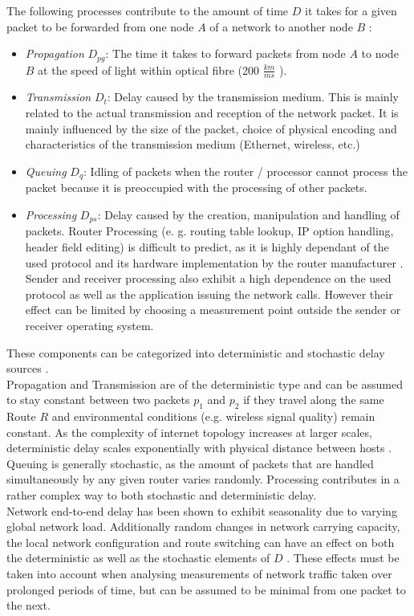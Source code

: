 \documentclass[12pt,a4paper,automark, toc=bib]{scrreprt}
\theoremstyle{definition}
\begin{document}
			The following processes contribute to the amount of time $D$ it takes for a given packet to be forwarded from one node $A$ of a network to another node $B$  \cite{Goonatilake2012, Bovy}:
			\begin{itemize}
				\item \textit{Propagation} $D_{pg}$: The time it takes to forward packets from node $A$ to node $B$ at the speed of light within optical fibre (200 $\frac{km}{ms}$  \cite{Cottrel2015}).  
				\item \textit{Transmission} $D_{t}$: Delay caused by the transmission medium. This is mainly related to the actual transmission and reception of the network packet. It is mainly influenced by the size of the packet, choice of physical encoding and characteristics of the transmission medium (Ethernet, wireless, etc.) 
				\item \textit{Queuing} $D_{q}$: Idling of packets when the router / processor cannot process the packet because it is preoccupied with the processing of other packets. 
				\item \textit{Processing} $D_{ps}$: Delay caused by the creation, manipulation and handling of packets. Router Processing (e. g. routing table lookup, IP option handling, header field editing) is difficult to predict, as it is highly dependant of the used protocol and its hardware implementation by the router manufacturer  \cite{Popescu2008}. Sender and receiver processing also exhibit a high dependence on the used protocol as well as the application issuing the network calls. However their effect can be limited by choosing a measurement point outside the sender or receiver operating system.
			\end{itemize}

			These components can be categorized into deterministic and stochastic delay sources  \cite{Bovy}. \\
			Propagation and Transmission are of the deterministic type and can be assumed to stay constant between two packets $p_1$ and $p_2$ if they travel along the same Route $R$ and environmental conditions (e.g. wireless signal quality) remain constant. As the complexity of internet topology increases at larger scales, deterministic delay scales exponentially with physical distance between hosts  \cite{Hillmann2015}. Queuing is generally stochastic, as the amount of packets that are handled simultaneously by any given router varies randomly. Processing contributes in a rather complex way to both stochastic and deterministic delay. \\ 
			Network end-to-end delay has been shown to exhibit seasonality  \cite{Hooghiemstra} due to varying global network load. Additionally random changes in network carrying capacity, the local network configuration and route switching can have an effect on both the deterministic as well as the stochastic elements of $D$  \cite{Bovy}. These effects must be taken into account when analysing measurements of network traffic taken over prolonged periods of time, but can be assumed to be minimal from one packet to the next. \\
			
\end{document}

